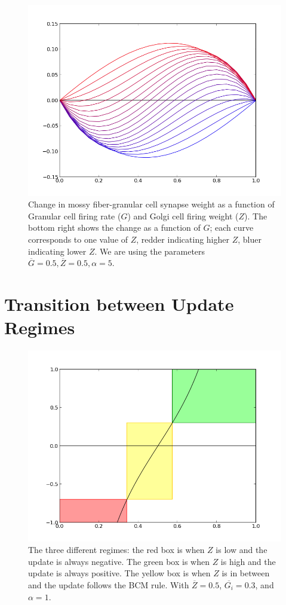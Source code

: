 \documentclass{article}
\theoremstyle{definition}
\begin{document}
\begin{figure}
\includegraphics[width=0.5\linewidth]{flocking6.png}
\caption{Change in mossy fiber-granular cell synapse weight as a
  function of Granular cell firing rate ($G$) and Golgi cell firing
  weight ($Z$). The bottom right shows the change as a function of
  $G$; each curve corresponds to one value of $Z$, redder indicating
  higher $Z$, bluer indicating lower $Z$. We are using the parameters
  $\overline{G}=0.5, \overline{Z}=0.5, \alpha=5$.}
\end{figure}

\section{Transition between Update Regimes}

\begin{figure}
\includegraphics{zgraph2.png}
\caption{The three different regimes: the red box is when $Z$ is low
  and the update is always negative. The green box is when $Z$ is high
  and the update is always positive. The yellow box is when $Z$ is in
  between and the update follows the BCM rule.  With $\overline{Z} = 0.5$,
  $\overline{G_i} = 0.3$, and $\alpha=1$.}
\label{fig-zgraph}
\end{figure}
\end{document}
